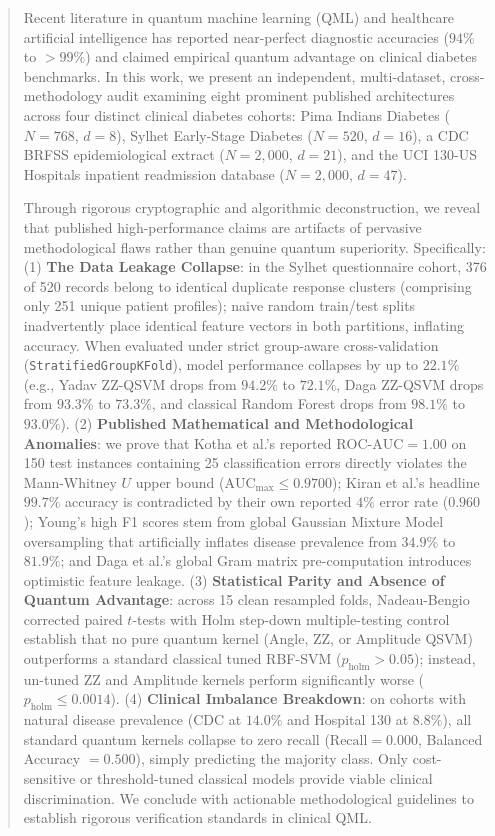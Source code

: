 \documentclass[journal,twocolumn]{IEEEtran}
\begin{document}
\begin{abstract}
Recent literature in quantum machine learning (QML) and healthcare artificial intelligence has reported near-perfect diagnostic accuracies ($94\%$ to $>99\%$) and claimed empirical quantum advantage on clinical diabetes benchmarks. In this work, we present an independent, multi-dataset, cross-methodology audit examining eight prominent published architectures across four distinct clinical diabetes cohorts: Pima Indians Diabetes ($N=768$, $d=8$), Sylhet Early-Stage Diabetes ($N=520$, $d=16$), a CDC BRFSS epidemiological extract ($N=2{,}000$, $d=21$), and the UCI 130-US Hospitals inpatient readmission database ($N=2{,}000$, $d=47$). 

Through rigorous cryptographic and algorithmic deconstruction, we reveal that published high-performance claims are artifacts of pervasive methodological flaws rather than genuine quantum superiority. Specifically: (1) \textbf{The Data Leakage Collapse}: in the Sylhet questionnaire cohort, 376 of 520 records belong to identical duplicate response clusters (comprising only 251 unique patient profiles); naive random train/test splits inadvertently place identical feature vectors in both partitions, inflating accuracy. When evaluated under strict group-aware cross-validation (\texttt{StratifiedGroupKFold}), model performance collapses by up to $22.1\%$ (e.g., Yadav ZZ-QSVM drops from $94.2\%$ to $72.1\%$, Daga ZZ-QSVM drops from $93.3\%$ to $73.3\%$, and classical Random Forest drops from $98.1\%$ to $93.0\%$). (2) \textbf{Published Mathematical and Methodological Anomalies}: we prove that Kotha et al.'s reported $\text{ROC-AUC}=1.00$ on 150 test instances containing 25 classification errors directly violates the Mann-Whitney $U$ upper bound ($\text{AUC}_{\max} \le 0.9700$); Kiran et al.'s headline $99.7\%$ accuracy is contradicted by their own reported $4\%$ error rate ($0.960$); Young's high F1 scores stem from global Gaussian Mixture Model oversampling that artificially inflates disease prevalence from $34.9\%$ to $81.9\%$; and Daga et al.'s global Gram matrix pre-computation introduces optimistic feature leakage. (3) \textbf{Statistical Parity and Absence of Quantum Advantage}: across 15 clean resampled folds, Nadeau-Bengio corrected paired $t$-tests with Holm step-down multiple-testing control establish that no pure quantum kernel (Angle, ZZ, or Amplitude QSVM) outperforms a standard classical tuned RBF-SVM ($p_{\text{holm}} > 0.05$); instead, un-tuned ZZ and Amplitude kernels perform significantly worse ($p_{\text{holm}} \le 0.0014$). (4) \textbf{Clinical Imbalance Breakdown}: on cohorts with natural disease prevalence (CDC at $14.0\%$ and Hospital 130 at $8.8\%$), all standard quantum kernels collapse to zero recall ($\text{Recall} = 0.000$, Balanced Accuracy $= 0.500$), simply predicting the majority class. Only cost-sensitive or threshold-tuned classical models provide viable clinical discrimination. We conclude with actionable methodological guidelines to establish rigorous verification standards in clinical QML.
\end{abstract}
\end{document}
